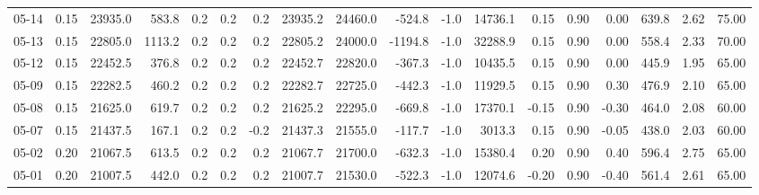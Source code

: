 \begin{threeparttable}
{\begin{tabular}{lrrrrrrrrrrrrrrrrr}
  05-14 &     0.15 & 23935.0 &             583.8 &               0.2 &                0.2 &                0.2 & 23935.2 & 24460.0 &     -524.8 &                     -1.0 &             14736.1 &       0.15 &      0.90 &           0.00 &            639.8 &            2.62 &                  75.00 \\
  05-13 &     0.15 & 22805.0 &            1113.2 &               0.2 &                0.2 &                0.2 & 22805.2 & 24000.0 &    -1194.8 &                     -1.0 &             32288.9 &       0.15 &      0.90 &           0.00 &            558.4 &            2.33 &                  70.00 \\
  05-12 &     0.15 & 22452.5 &             376.8 &               0.2 &                0.2 &                0.2 & 22452.7 & 22820.0 &     -367.3 &                     -1.0 &             10435.5 &       0.15 &      0.90 &           0.00 &            445.9 &            1.95 &                  65.00 \\
  05-09 &     0.15 & 22282.5 &             460.2 &               0.2 &                0.2 &                0.2 & 22282.7 & 22725.0 &     -442.3 &                     -1.0 &             11929.5 &       0.15 &      0.90 &           0.30 &            476.9 &            2.10 &                  65.00 \\
  05-08 &     0.15 & 21625.0 &             619.7 &               0.2 &                0.2 &                0.2 & 21625.2 & 22295.0 &     -669.8 &                     -1.0 &             17370.1 &      -0.15 &      0.90 &          -0.30 &            464.0 &            2.08 &                  60.00 \\
  05-07 &     0.15 & 21437.5 &             167.1 &               0.2 &                0.2 &               -0.2 & 21437.3 & 21555.0 &     -117.7 &                     -1.0 &              3013.3 &       0.15 &      0.90 &          -0.05 &            438.0 &            2.03 &                  60.00 \\
  05-02 &     0.20 & 21067.5 &             613.5 &               0.2 &                0.2 &                0.2 & 21067.7 & 21700.0 &     -632.3 &                     -1.0 &             15380.4 &       0.20 &      0.90 &           0.40 &            596.4 &            2.75 &                  65.00 \\
  05-01 &     0.20 & 21007.5 &             442.0 &               0.2 &                0.2 &                0.2 & 21007.7 & 21530.0 &     -522.3 &                     -1.0 &             12074.6 &      -0.20 &      0.90 &          -0.40 &            561.4 &            2.61 &                  65.00 \\

\end{tabular}}
\end{threeparttable}
